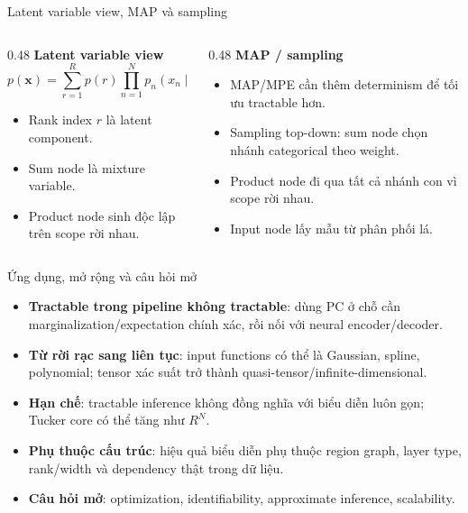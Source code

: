 \begin{frame}{Latent variable view, MAP và sampling}
\begin{columns}[T,totalwidth=\textwidth]
    \begin{column}{0.48\textwidth}
        \textbf{Latent variable view}
        \[
            p(\mathbf{x})
            =
            \sum_{r=1}^{R}p(r)\prod_{n=1}^{N}p_n(x_n\mid r)
        \]
        \begin{itemize}
            \item Rank index $r$ là latent component.
            \item Sum node là mixture variable.
            \item Product node sinh độc lập trên scope rời nhau.
        \end{itemize}
    \end{column}
    \begin{column}{0.48\textwidth}
        \textbf{MAP / sampling}
        \begin{itemize}
            \item MAP/MPE cần thêm determinism để tối ưu tractable hơn.
            \item Sampling top-down: sum node chọn nhánh categorical theo weight.
            \item Product node đi qua tất cả nhánh con vì scope rời nhau.
            \item Input node lấy mẫu từ phân phối lá.
        \end{itemize}
    \end{column}
\end{columns}
\end{frame}

\begin{frame}{Ứng dụng, mở rộng và câu hỏi mở}
\small
\begin{itemize}
    \item \textbf{Tractable trong pipeline không tractable}: dùng PC ở chỗ cần marginalization/expectation chính xác, rồi nối với neural encoder/decoder.
    \item \textbf{Từ rời rạc sang liên tục}: input functions có thể là Gaussian, spline, polynomial; tensor xác suất trở thành quasi-tensor/infinite-dimensional.
    \item \textbf{Hạn chế}: tractable inference không đồng nghĩa với biểu diễn luôn gọn; Tucker core có thể tăng như $R^N$.
    \item \textbf{Phụ thuộc cấu trúc}: hiệu quả biểu diễn phụ thuộc region graph, layer type, rank/width và dependency thật trong dữ liệu.
    \item \textbf{Câu hỏi mở}: optimization, identifiability, approximate inference, scalability.
\end{itemize}
\end{frame}
